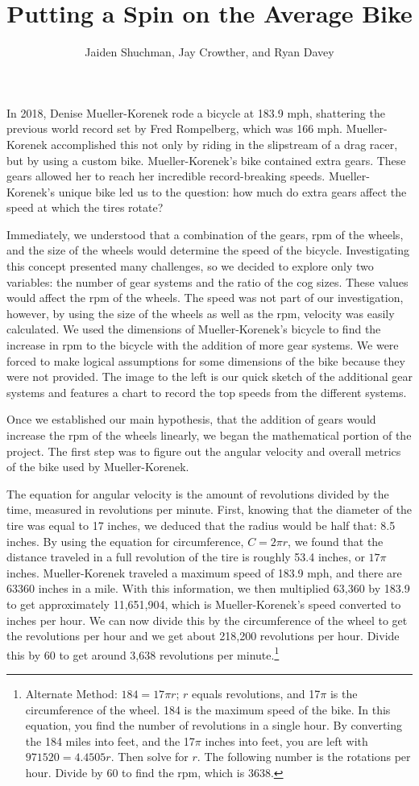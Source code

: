 \documentclass{article}
\title{Putting a Spin on the Average Bike}
\begin{document}
\author{Jaiden Shuchman, Jay Crowther, and Ryan Davey}
\maketitle

In 2018, Denise Mueller-Korenek rode a bicycle at 183.9 mph, shattering the previous world record set by Fred Rompelberg, which was 166 mph. Mueller-Korenek accomplished this not only by riding in the slipstream of a drag racer, but by using a custom bike.  Mueller-Korenek’s bike contained extra gears. These gears allowed her to reach her incredible record-breaking speeds. Mueller-Korenek’s unique bike led us to the question: how much do  extra gears affect the speed at which the tires rotate?

Immediately, we understood that a combination of the gears, rpm of the wheels, and the size of the wheels would determine the speed of the bicycle. Investigating this concept presented  many challenges, so we decided to explore only two variables: the number of gear systems and  the ratio of the cog sizes. These values would affect the rpm of the wheels. The speed was not part of our investigation, however, by using the size of the wheels as well as the rpm, velocity  was easily calculated. We used the dimensions of Mueller-Korenek’s bicycle to find the increase in rpm to the bicycle with the addition of more gear systems. We were forced to make logical assumptions for some dimensions of the bike because they were not provided. The image to the left is our quick sketch of the additional gear systems and features a chart to record the top  speeds from the different systems. 

Once we established our main hypothesis, that the addition of gears would increase the rpm of the wheels linearly, we began the mathematical portion of the project. The first step was to figure out the angular velocity and overall metrics of the bike used by Mueller-Korenek.

The equation for angular velocity is the amount of revolutions divided by the time, measured in revolutions per minute. First, knowing that the diameter of the tire was equal to 17 inches, we deduced that the radius would be half that: 8.5 inches. By using the equation for circumference, $C=2 \pi r$, we found that the distance traveled in a full revolution of the tire is roughly 53.4 inches, or $17\pi$ inches. Mueller-Korenek traveled a maximum speed of 183.9 mph, and there are 63360 inches in a mile. With this information, we then multiplied 63,360 by 183.9 to get approximately 11,651,904, which is Mueller-Korenek’s speed converted to inches per hour. We can now divide this by the circumference of the wheel to get the revolutions per hour and we get about 218,200 revolutions per hour. Divide this by 60 to get around 3,638  revolutions per minute.\footnote{Alternate Method: $184=17 \pi r$; $r$ equals revolutions, and 17$\pi$ is the circumference of the wheel. 184 is the maximum speed of the bike. In this equation, you find the number of revolutions in a single hour. By converting the 184 miles into feet, and the 17$\pi$ inches into feet, you are left with $971520=4.4505r$. Then solve for $r$. The following number is the rotations per hour. Divide by 60 to find the rpm, which is 3638.}
\end{document}
